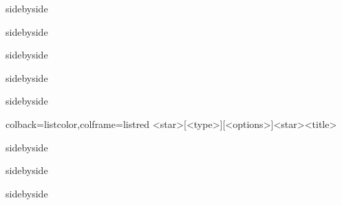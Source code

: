 \documentclass[fontset=none]{ctexart}
\begin{document}
	\begin{dispExample*}{sidebyside}
		
	\end{dispExample*}
	
	
	\begin{dispExample*}{sidebyside}
		
	\end{dispExample*}
	
	
	
	\begin{dispExample*}{sidebyside}
		
	\end{dispExample*}
	
	
	
	\begin{dispExample*}{sidebyside}
		
	\end{dispExample*}
	
	
	\begin{dispExample*}{sidebyside}
		
	\end{dispExample*}
	
	\begin{dispListing*}{colback=listcolor,colframe=listred}
		[<type>][<options>]<star>{<title>}
	\end{dispListing*}
	
	\begin{dispExample*}{sidebyside}
		
	\end{dispExample*}
	
	
	\begin{dispExample*}{sidebyside}
		
	\end{dispExample*}
	
	
	
	\begin{dispExample*}{sidebyside}
		
	\end{dispExample*}
	
\end{document}
